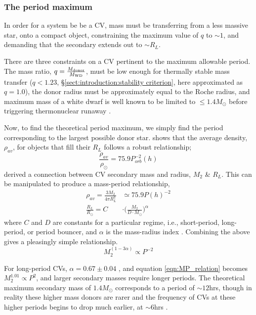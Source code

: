 \subsubsection{The period maximum}
\label{sect:introduction:period maximum}
In order for a system be be a CV, mass must be transferring from a less massive star, onto a compact object, constraining the maximum value of $q$ to $\sim1$, and demanding that the secondary extends out to $\sim R_L$. 

There are three constraints on a CV pertinent to the maximum allowable period. The mass ratio, $q = \frac{M_{\rm donor}}{M_{\rm WD}}$, must be low enough for thermally stable mass transfer ($q < 1.23$, \S\ref{sect:introduction:stability criterion}, here approximated as $q = 1.0$), the donor radius must be approximately equal to the Roche radius, and maximum mass of a white dwarf is well known to be limited to $\le 1.4M_{\odot}$ before triggering thermonuclear runaway \citep{chandrasekhar1942}.

Now, to find the theoretical period maximum, we simply find the period corresponding to the largest possible donor star. \citet{warner1995} shows that the average density, $\rho_{av}$, for objects that fill their $R_L$ follows a robust relationship;
\begin{equation}
    \frac{\rho_{av}}{\rho_{\odot}} = 75.9 P_{orb}^{-2}(h)
\end{equation}
\citet{knigge11} derived a connection between CV secondary mass and radius, $M_2$ \& $R_L$. This can be manipulated to produce a mass-period relationship,
\begin{align}
    \rho_{av} = \frac{3 M_2}{4 \pi R_L^3} &\simeq 75.9 P(h)^{-2} \\
    \frac{R_L}{R_\odot} = C &\cdot \Big( \frac{M_2}{D \cdot M_\odot} \Big) ^{\alpha}
\end{align}
where $C$ and $D$ are constants for a particular regime, i.e., short-period, long-period, or period bouncer, and $\alpha$ is the mass-radius index \citep{Knigge2011b}.
Combining the above gives a pleasingly simple relationship.
\begin{equation}
\label{eqn:MP_relation}
    M_2^{(1-3\alpha)} \propto P^{-2}
\end{equation}

For long-period CVs, $\alpha = 0.67\pm0.04$ \citep{knigge11}, and equation \ref{eqn:MP_relation} becomes $M_2^{1.01} \propto P^{2}$, and larger secondary masses require longer periods. The theoretical maximum secondary mass of $1.4 M_{\odot}$ corresponds to a period of $\sim12$hrs, though in reality these higher mass donors are rarer and the frequency of CVs at these higher periods begins to drop much earlier, at $\sim6$hrs \citep{gaensicke2009}.


